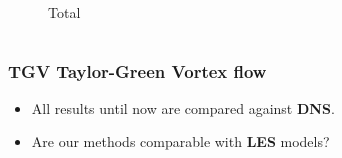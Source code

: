 \begin{frame}
\begin{columns}
\begin{column}{0.5\textwidth}
\begin{figure}
     \vspace*{-0.8cm}
     \caption{Total}
   \end{figure}
   \end{column}
 \end{columns}
 \begin{overlayarea}{\textwidth}{1.5cm}
  \end{overlayarea}
\end{frame}
\addtocounter{framenumber}{-1}
\begin{frame}
 \frametitle{TGV {\small Taylor-Green Vortex flow}}
 \vfill
 {\large
 \begin{itemize}
 	\item All results until now are compared against \textbf{DNS}.
 \end{itemize}
 \vspace*{0.5cm}
  \begin{itemize}
  	\item Are our methods comparable with \textbf{LES} models?
 \end{itemize}}
 \vfill
\end{frame}
